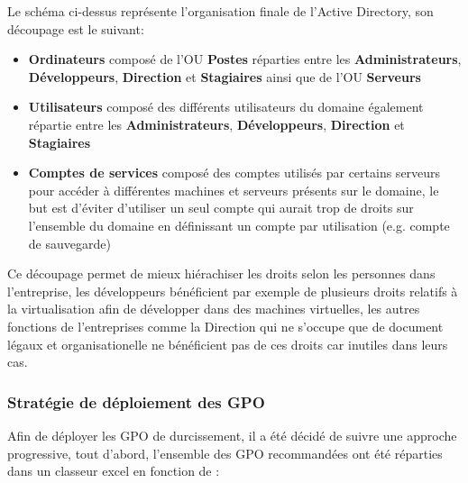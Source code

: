 \documentclass[a4paper, 11pt]{article}
\begin{document}
Le schéma ci-dessus représente l'organisation finale de l'Active Directory, son découpage est le suivant:
\par\bigskip


\begin{itemize}
  \item[$\bullet$] \textbf{Ordinateurs} composé de l'OU \textbf{Postes} réparties entre les \textbf{Administrateurs}, \textbf{Développeurs}, \textbf{Direction} et \textbf{Stagiaires} ainsi que de l'OU \textbf{Serveurs}
  \item[$\bullet$] \textbf{Utilisateurs} composé des différents utilisateurs du domaine également répartie entre les \textbf{Administrateurs}, \textbf{Développeurs}, \textbf{Direction} et \textbf{Stagiaires}
  \item[$\bullet$] \textbf{Comptes de services} composé des comptes utilisés par certains serveurs pour accéder à différentes machines et serveurs présents sur le domaine, le but est d'éviter d'utiliser un seul compte qui aurait trop de droits sur l'ensemble du domaine en définissant un compte par utilisation (e.g. compte de sauvegarde)
\end{itemize}
\par\bigskip

Ce découpage permet de mieux hiérachiser les droits selon les personnes dans l'entreprise, les développeurs bénéficient par exemple de plusieurs droits relatifs à la virtualisation afin
de développer dans des machines virtuelles, les autres fonctions de l'entreprises comme la Direction qui ne s'occupe que de document légaux et organisationelle ne bénéficient pas de ces droits car inutiles dans leurs cas.


\subsubsection{Stratégie de déploiement des GPO}
Afin de déployer les GPO de durcissement, il a été décidé de suivre une approche progressive, tout d'abord, l'ensemble des GPO
recommandées ont été réparties dans un classeur excel en fonction de :
\par\bigskip
\end{document}
